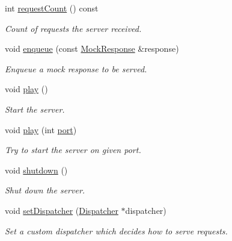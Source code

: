 \begin{DoxyCompactItemize}
int \hyperlink{class_qt_mock_web_server_a3d0745d34a224fcf31042d5b5438bbc6}{request\+Count} () const 
\begin{DoxyCompactList}\small\item\em Count of requests the server received. \end{DoxyCompactList}\item 
void \hyperlink{class_qt_mock_web_server_abb8bebe8b9db1d772ea84b244e64f138}{enqueue} (const \hyperlink{class_mock_response}{Mock\+Response} \&response)
\begin{DoxyCompactList}\small\item\em Enqueue a mock response to be served. \end{DoxyCompactList}\item 
\hypertarget{class_qt_mock_web_server_a5bad6c701969176fefd90d47417981c5}{void \hyperlink{class_qt_mock_web_server_a5bad6c701969176fefd90d47417981c5}{play} ()}\label{class_qt_mock_web_server_a5bad6c701969176fefd90d47417981c5}

\begin{DoxyCompactList}\small\item\em Start the server. \end{DoxyCompactList}\item 
void \hyperlink{class_qt_mock_web_server_a879a7db2d5b375323bdb464a6031084d}{play} (int \hyperlink{class_qt_mock_web_server_a83034aa1dbf8114d6b1bc01dd97cd2f3}{port})
\begin{DoxyCompactList}\small\item\em Try to start the server on given port. \end{DoxyCompactList}\item 
\hypertarget{class_qt_mock_web_server_a65f0a8d5b67723a4631fcf2741c787ff}{void \hyperlink{class_qt_mock_web_server_a65f0a8d5b67723a4631fcf2741c787ff}{shutdown} ()}\label{class_qt_mock_web_server_a65f0a8d5b67723a4631fcf2741c787ff}

\begin{DoxyCompactList}\small\item\em Shut down the server. \end{DoxyCompactList}\item 
void \hyperlink{class_qt_mock_web_server_af035f3eee01d9b857923d917f6b57098}{set\+Dispatcher} (\hyperlink{class_dispatcher}{Dispatcher} $\ast$dispatcher)
\begin{DoxyCompactList}\small\item\em Set a custom dispatcher which decides how to serve requests. \end{DoxyCompactList}\end{DoxyCompactItemize}


